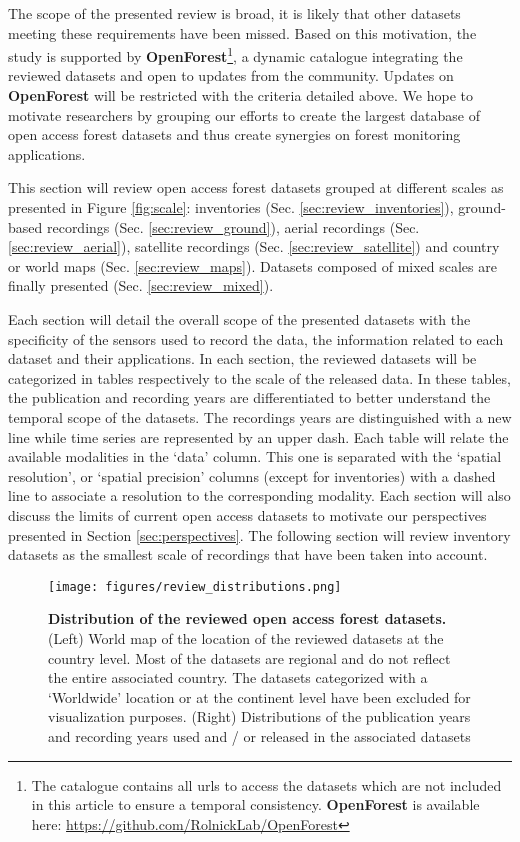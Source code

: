 \documentclass{CUP-JNL-DTM}%
\theoremstyle{definition}
\numberwithin{equation}{section}
\begin{document}
The scope of the presented review is broad, it is likely that other datasets meeting these requirements have been missed.
Based on this motivation, the study is supported by \textbf{OpenForest}\footnote{The catalogue contains all urls to access the datasets which are not included in this article to ensure a temporal consistency. \textbf{OpenForest} is available here: \url{https://github.com/RolnickLab/OpenForest}}, a dynamic catalogue integrating the reviewed datasets and open to updates from the community. Updates on \textbf{OpenForest} will be restricted with the criteria detailed above. We hope to motivate researchers by grouping our efforts to create the largest database of open access forest datasets and thus create synergies %
on forest monitoring applications.

This section will review open access forest datasets grouped at different scales as presented in Figure \ref{fig:scale}: inventories (Sec. \ref{sec:review_inventories}), ground-based recordings (Sec. \ref{sec:review_ground}), aerial recordings (Sec. \ref{sec:review_aerial}), satellite recordings (Sec. \ref{sec:review_satellite}) and country or world maps (Sec. \ref{sec:review_maps}). Datasets composed of mixed scales are finally presented (Sec. \ref{sec:review_mixed}). 

Each section will detail the overall scope of the presented datasets with the specificity of the sensors used to record the data, the information related to each dataset and their applications.
%
In each section, the reviewed datasets will be categorized in tables respectively to the scale of the released data. 
In these tables, the publication and recording years are differentiated to better understand the temporal scope of the datasets. The recordings years are distinguished with a new line while time series are represented by an upper dash.
Each table will relate the available modalities in the `data' column. This one is separated with the `spatial resolution', or `spatial precision' columns (except for inventories) with a dashed line to associate a resolution to the corresponding modality.
%
Each section will also discuss the limits of current open access datasets to motivate our perspectives presented in Section \ref{sec:perspectives}.
%
The following section will review inventory datasets as the smallest scale of recordings that have been taken into account.


\begin{figure}[t]%
\texttt{[image: figures/review\_distributions.png]}
\caption{
\textbf{Distribution of the reviewed open access forest datasets.} (Left) World map of the location of the reviewed datasets at the country level. Most of the datasets are regional and do not reflect the entire associated country. The datasets categorized with a `Worldwide' location or at the continent level have been excluded for visualization purposes. (Right) Distributions of the publication years and recording years used and / or released in the associated datasets}
\label{fig:distributions}
\end{figure}
\end{document}
